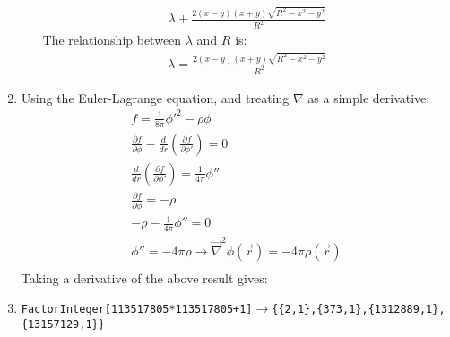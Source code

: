 \documentclass[12pt]{article}
\newcommand{\p}[2]{\frac{\partial #1}{\partial #2}}
\newcommand{\der}[2]{\frac{d #1}{d #2}}
\begin{document}
\begin{enumerate}
\begin{enumerate}
\begin{gather*}
        \lambda+\frac{2 (x-y) (x+y) \sqrt{R^2-x^2-y^2}}{R^2}
      \end{gather*}
      The relationship between $\lambda$ and $R$ is:
      \begin{gather*}
        \lambda= \frac{2 (x-y) (x+y) \sqrt{R^2-x^2-y^2}}{R^2}
      \end{gather*}
    \end{enumerate}
    \item
    Using the Euler-Lagrange equation, and treating $\nabla$ as a simple derivative:
    \begin{gather*}
      f=\frac{1}{8\pi}\phi'^2-\rho\phi\\
      \p{f}{\phi}-\der{}{r}\left(\p{f}{\phi'}\right)=0\\
      \der{}{r}\left(\p{f}{\phi'}\right)=\frac{1}{4\pi}\phi''\\
      \p{f}{\phi}=-\rho\\
      -\rho-\frac{1}{4\pi}\phi''=0\\
      \phi''=-4\pi\rho\rightarrow\vec{\nabla}^2\phi(\vec{r})=-4\pi\rho(\vec{r})\\
    \end{gather*}
    Taking a derivative of the above result gives:
    \item \texttt{FactorInteger[113517805*113517805+1]}$\rightarrow$\texttt{\{\{2,1\},\{373,1\},\{1312889,1\},\{13157129,1\}\}}
  \end{enumerate}
\end{document}
